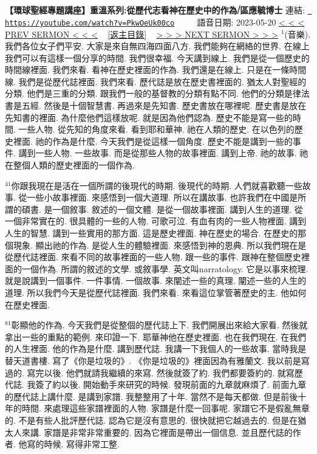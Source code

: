 \documentclass{book}
\begin{document}
\section{}
\label{sec:PkwOeUk00co}
\textbf{【環球聖經專題講座】重溫系列:從歷代志看神在歷史中的作為⧸區應毓博士}
\newline
\newline
連結: \href{https://youtube.com/watch?v=PkwOeUk00co}{\texttt{ https://youtube.com/watch?v=PkwOeUk00co}} ~~~~ 語音日期: 2023-05-20 
\newline
\newline
\hyperref[sec:code]{\small{< < < PREV SERMON < < <}}
~
\hyperref[sec:index]{\small{[返主目錄]}}
~
\hyperref[sec:zm_TxjjjYm8]{\small{> > > NEXT SERMON > > >}}
\newline
\newline
$^{1}$(音樂).
我們各位女子們平安.
大家是來自無四海四面八方.
我們能夠在網絡的世界.
在線上我們可以有這樣一個分享的時間.
我們很幸福.
今天講到線上.
我們是從一個歷史的時間線裡面.
我們來看.
看神在歷史裡面的作為.
我們還是在線上.
只是在一條時間線.
我們是從歷代誌裡面.
我們來看.
歷代誌是放在歷史書裡面的.
猶太人對聖經的分類.
他們是三重的分類.
跟我們一般的基督教的分類有點不同.
他們的分類是律法書是五經.
然後是十個智慧書.
再過來是先知書.
歷史書放在哪裡呢.
歷史書是放在先知書的裡面.
為什麼他們這樣放呢.
就是因為他們認為.
歷史不能是寫一些的時間.
一些人物.
從先知的角度來看.
看到耶和華神.
祂在人類的歷史.
在以色列的歷史裡面.
祂的作為是什麼.
今天我們是從這樣一個角度.
歷史不能是講到一些的事件.
講到一些人物.
一些故事.
而是從那些人物的故事裡面.
講到上帝.
祂的故事.
祂在整個人類的歷史裡面的一個作為.

$^{41}$你跟我現在是活在一個所謂的後現代的時期.
後現代的時期.
人們就喜歡聽一些故事.
從一些小故事裡面.
來感悟到一個大道理.
所以在講故事.
也許我們在中國是所謂的碩書.
是一個敘事.
敘述的一個文體.
是從一個故事裡面.
講到人生的道理.
從一個非常實在的.
很具體的一些的人物.
可歌可泣.
有血有肉的一些人物裡面.
講到人生的智慧.
講到一些實用的那方面.
這是歷史裡面.
神在歷史的場合.
在歷史的那個現象.
顯出祂的作為.
是從人生的體驗裡面.
來感悟到神的恩典.
所以我們現在是從歷代誌裡面.
來看不同的故事裡面的一些人物.
跟一些的事件.
跟神在整個歷史裡面的一個作為.
所謂的敘述的文學.
或敘事學.
英文叫narratology.
它是以事來梳理.
就是說講到一個事件.
一件事情.
一個故事.
來闡述一些的真理.
闡述一些的人生的道理.
所以我們今天是從歷代誌裡面.
我們來看.
來看這位掌管著歷史的主.
他如何在歷史裡面.

$^{81}$彰顯他的作為.
今天我們是從整個的歷代誌上下.
我們開展出來給大家看.
然後就拿出一些的重點的範例.
來印證一下.
耶華神他在歷史裡面.
也在我們現在.
在我們的人生裡面.
他的作為是什麼.
講到歷代誌.
我講一下我個人的一些故事.
當時我是替天道書樓.
寫了《你是垃圾的》.
《你是垃圾的》裡面因為有雅蘭文.
我以前是寫過的.
寫完以後.
他們就請我繼續的來寫.
然後就簽了約.
我們都要簽約的.
就寫歷代誌.
我簽了約以後.
開始動手來研究的時候.
發現前面的九章就麻煩了.
前面九章的歷代誌上講什麼.
是講到家譜.
我整整用了十年.
當然不是每天都做.
但是前後十年的時間.
來處理這些家譜裡面的人物.
家譜是什麼一回事呢.
家譜它不是假亂無章的.
不是有些人批評歷代誌.
認為它是沒有意思的.
很快就把它越過去的.
但是在猶太人來講.
家譜是非常非常重要的.
因為它裡面是帶出一個信息.
並且歷代誌的作者.
他寫的時候.
寫得非常工整.
\end{document}
